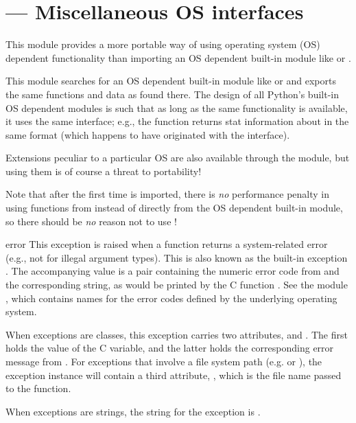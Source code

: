 \section{ ---
         Miscellaneous OS interfaces}



This module provides a more portable way of using operating system
(OS) dependent functionality than importing an OS dependent built-in
module like  or .

This module searches for an OS dependent built-in module like
 or  and exports the same functions and data
as found there.  The design of all Python's built-in OS dependent
modules is such that as long as the same functionality is available,
it uses the same interface; e.g., the function
 returns stat information about 
in the same format (which happens to have originated with the \POSIX{}
interface).

Extensions peculiar to a particular OS are also available through the
 module, but using them is of course a threat to
portability!

Note that after the first time  is imported, there is
\emph{no} performance penalty in using functions from 
instead of directly from the OS dependent built-in module, so there
should be \emph{no} reason not to use !


\begin{excdesc}{error}
This exception is raised when a function returns a
system-related error (e.g., not for illegal argument types).  This is
also known as the built-in exception .  The
accompanying value is a pair containing the numeric error code from
 and the corresponding string, as would be printed by the
C function .  See the module
, which contains names for the
error codes defined by the underlying operating system.

When exceptions are classes, this exception carries two attributes,
 and .  The first holds the value of
the C  variable, and the latter holds the corresponding
error message from .  For exceptions that
involve a file system path (e.g.  or
), the exception instance will contain a third
attribute, , which is the file name passed to the
function.

When exceptions are strings, the string for the exception is
.
\end{excdesc}


